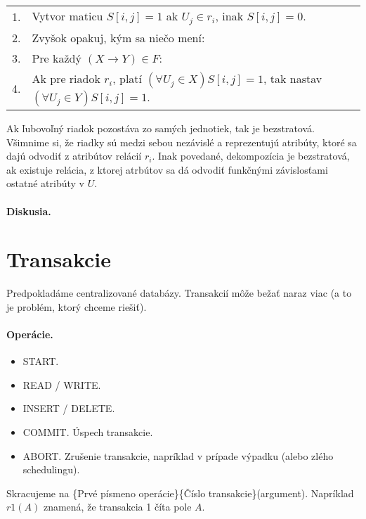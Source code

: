 \documentclass[10pt,a4paper]{article}
\begin{document}
\begin{tabular}{ll}
1. & Vytvor maticu $S[i,j] = 1$ ak $U_j \in r_i$, inak $S[i,j] = 0$.\\
2. & Zvyšok opakuj, kým sa niečo mení:\\
3. & Pre každý $(X \rightarrow Y) \in F$:\\
4. & Ak pre riadok $r_i$, platí $(\forall U_j \in X)S[i,j]=1$, tak nastav
     $(\forall U_j \in Y)S[i,j]=1$.\\
\end{tabular}

Ak ľubovoľný riadok pozostáva zo samých jednotiek, tak je bezstratová. Všimnime si, že riadky sú medzi sebou nezávislé a reprezentujú atribúty, ktoré sa dajú odvodiť z atribútov relácií $r_i$. 
Inak povedané, dekompozícia je bezstratová, ak existuje relácia, z ktorej atrbútov sa dá odvodiť funkčnými závislosťami ostatné atribúty v $U$. 

\paragraph{Diskusia.}
    
\section{Transakcie} 

Predpokladáme centralizované databázy. Transakcií môže bežať naraz viac (a to je problém, ktorý chceme riešiť).  

\paragraph{Operácie.}
\begin{itemize}
\item START.
\item READ / WRITE.
\item INSERT / DELETE.
\item COMMIT. Úspech transakcie. 
\item ABORT. Zrušenie transakcie, napríklad v prípade výpadku (alebo zlého schedulingu).  
\end{itemize}

Skracujeme na \{Prvé písmeno operácie\}\{Číslo transakcie\}(argument). Napríklad $r1(A)$ znamená, že transakcia 1 číta pole $A$. 
\end{document}
